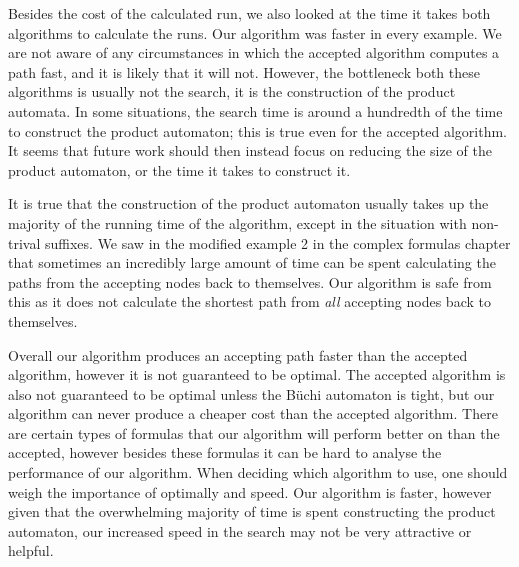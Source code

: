 Besides the cost of the calculated run, we also looked at the time it takes both algorithms to calculate the runs. Our algorithm was faster in every example. We are not aware of any circumstances in which the accepted algorithm computes a path fast, and it is likely that it will not. However, the bottleneck both these algorithms is usually not the search, it is the construction of the product automata. In some situations, the search time is around a hundredth of the time to construct the product automaton; this is true even for the accepted algorithm. It seems that future work should then instead focus on reducing the size of the product automaton, or the time it takes to construct it. 

It is true that the construction of the product automaton usually takes up the majority of the running time of the algorithm, except in the situation with non-trival suffixes. We saw in the modified example 2 in the complex formulas chapter that sometimes an incredibly large amount of time can be spent calculating the paths from the accepting nodes back to themselves. Our algorithm is safe from this as it does not calculate the shortest path from \textit{all} accepting nodes back to themselves. 

Overall our algorithm produces an accepting path faster than the accepted algorithm, however it is not guaranteed to be optimal. The accepted algorithm is also not guaranteed to be optimal unless the B\"uchi automaton is tight, but our algorithm can never produce a cheaper cost than the accepted algorithm. There are certain types of formulas that our algorithm will perform better on than the accepted, however besides these formulas it can be hard to analyse the performance of our algorithm. When deciding which algorithm to use, one should weigh the importance of optimally and speed. Our algorithm is faster, however given that the overwhelming majority of time is spent constructing the product automaton, our increased speed in the search may not be very attractive or helpful.  